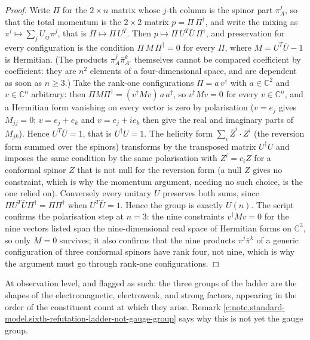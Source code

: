 \documentclass[11pt]{article}
\theoremstyle{definition}
\theoremstyle{plain}
\providecommand{\C}{}\renewcommand{\C}{\mathbb{C}}
\begin{document}
\begin{proof}
Write $\Pi$ for the $2 \times n$ matrix whose $j$-th column is the spinor part $\pi^{j}_{A}$, so that the total momentum is the $2 \times 2$ matrix $p = \Pi\,\Pi^{\dagger}$, and write the mixing as $\pi^{i} \mapsto \sum_{j} U_{ij}\pi^{j}$, that is $\Pi \mapsto \Pi\,U^{T}$. Then $p \mapsto \Pi\,U^{T}\bar{U}\,\Pi^{\dagger}$, and preservation for every configuration is the condition $\Pi\,M\,\Pi^{\dagger} = 0$ for every $\Pi$, where $M = U^{T}\bar{U} - 1$ is Hermitian. (The products $\pi^{j}_{A}\bar\pi^{k}_{A'}$ themselves cannot be compared coefficient by coefficient: they are $n^{2}$ elements of a four-dimensional space, and are dependent as soon as $n \ge 3$.) Take the rank-one configurations $\Pi = a\,v^{\dagger}$ with $a \in \C^{2}$ and $v \in \C^{n}$ arbitrary: then $\Pi M \Pi^{\dagger} = (v^{\dagger}Mv)\,a\,a^{\dagger}$, so $v^{\dagger}Mv = 0$ for every $v \in \C^{n}$, and a Hermitian form vanishing on every vector is zero by polarisation ($v = e_{j}$ gives $M_{jj} = 0$; $v = e_{j} + e_{k}$ and $v = e_{j} + ie_{k}$ then give the real and imaginary parts of $M_{jk}$). Hence $U^{T}\bar{U} = 1$, that is $U^{\dagger}U = 1$. The helicity form $\sum_{i}\bar{Z}^{i}\cdot Z^{i}$ (the reversion form summed over the spinors) transforms by the transposed matrix $U^{\dagger}U$ and imposes the same condition by the same polarisation with $Z^{i} = c_{i}Z$ for a conformal spinor $Z$ that is not null for the reversion form (a null $Z$ gives no constraint, which is why the momentum argument, needing no such choice, is the one relied on). Conversely every unitary $U$ preserves both sums, since $\Pi U^{T}\bar{U}\Pi^{\dagger} = \Pi\Pi^{\dagger}$ when $U^{T}\bar{U} = 1$. Hence the group is exactly $U(n)$. The script confirms the polarisation step at $n = 3$: the nine constraints $v^{\dagger}Mv = 0$ for the nine vectors listed span the nine-dimensional real space of Hermitian forms on $\C^{3}$, so only $M = 0$ survives; it also confirms that the nine products $\pi^{j}\bar\pi^{k}$ of a generic configuration of three conformal spinors have rank four, not nine, which is why the argument must go through rank-one configurations.

\end{proof}

\label{c:note.standard-model.setting-internal-symmetry-ladder}
At observation level, and flagged as such: the three groups of the ladder are the shapes of the electromagnetic, electroweak, and strong factors, appearing in the order of the constituent count at which they arise. Remark \ref{c:note.standard-model.sixth-refutation-ladder-not-gauge-group} says why this is not yet the gauge group.
\end{document}
